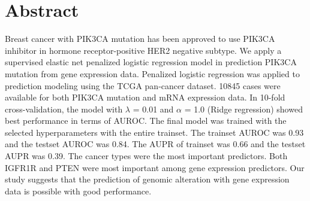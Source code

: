 \documentclass[10pt,letterpaper]{article}
\newcommand{\getIndex}[2]{
  \ForEach{,}{\IfEq{#1}{\thislevelitem}{\number\thislevelcount\ExitForEach}{}}{#2}
}
\newcommand{\getAff}[1]{
  \getIndex{#1}{Department of Hospital Pathology, Seoul St.~Mary's Hospital}
}
\begin{document}
\vspace*{0.2in}

\section*{Abstract}
Breast cancer with PIK3CA mutation has been approved to use PIK3CA
inhibitor in hormone receptor-positive HER2 negative subtype. We apply a
supervised elastic net penalized logistic regression model in prediction
PIK3CA mutation from gene expression data. Penalized logistic regression
was applied to prediction modeling using the TCGA pan-cancer dataset.
10845 cases were available for both PIK3CA mutation and mRNA expression
data. In 10-fold cross-validation, the model with \(\lambda\) = 0.01 and
\(\alpha\) = 1.0 (Ridge regression) showed best performance in terms of
AUROC. The final model was trained with the selected hyperparameters
with the entire trainset. The trainset AUROC was 0.93 and the testset
AUROC was 0.84. The AUPR of trainset was 0.66 and the testset AUPR was
0.39. The cancer types were the most important predictors. Both IGFR1R
and PTEN were most important among gene expression predictors. Our study
suggests that the prediction of genomic alteration with gene expression
data is possible with good performance.
\end{document}
